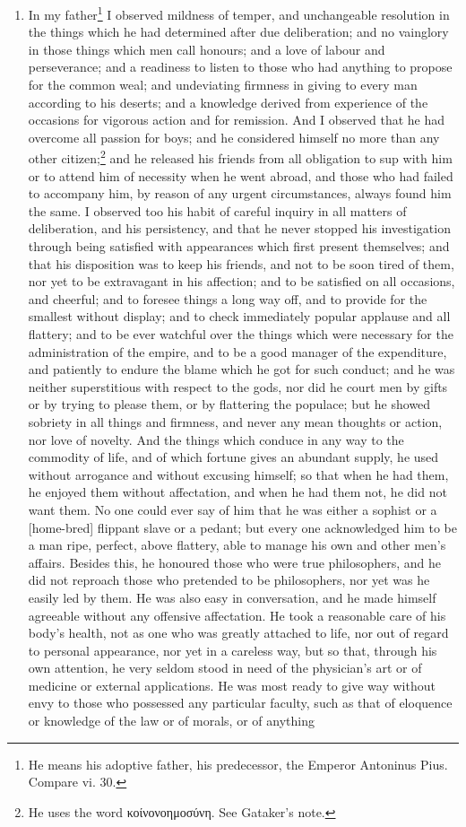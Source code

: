 \begin{enumerate}
\item In my father\footnote{He means his adoptive father, his predecessor, the Emperor Antoninus Pius. Compare vi. 30.} I observed mildness of temper, and unchangeable resolution in the things which he had determined after due deliberation; and no vainglory in those things which men call honours; and a love of labour and perseverance; and a readiness to listen to those who had anything to propose for the common weal; and undeviating firmness in giving to every man according to his deserts; and a knowledge derived from experience of the occasions for vigorous action and for remission. And I observed that he had overcome all passion for boys; and he considered himself no more than any other citizen;\footnote{He uses the word \textgreek{κοίνονοημοσύνη}. See Gataker's note.} and he released his friends from all obligation to sup with him or to attend him of necessity when he went abroad, and those who had failed to accompany him, by reason of any urgent circumstances, always found him the same. I observed too his habit of careful inquiry in all matters of deliberation, and his persistency, and that he never stopped his investigation through being satisfied with appearances which first present themselves; and that his disposition was to keep his friends, and not to be soon tired of them, nor yet to be extravagant in his affection; and to be satisfied on all occasions, and cheerful; and to foresee things a long way off, and to provide for the smallest without display; and to check immediately popular applause and all flattery; and to be ever watchful over the things which were necessary for the administration of the empire, and to be a good manager of the expenditure, and patiently to endure the blame which he got for such conduct; and he was neither superstitious with respect to the gods, nor did he court men by gifts or by trying to please them, or by flattering the populace; but he showed sobriety in all things and firmness, and never any mean thoughts or action, nor love of novelty. And the things which conduce in any way to the commodity of life, and of which fortune gives an abundant supply, he used without arrogance and without excusing himself; so that when he had them, he enjoyed them without affectation, and when he had them not, he did not want them. No one could ever say of him that he was either a sophist or a [{\clarify home-bred}] flippant slave or a pedant; but every one acknowledged him to be a man ripe, perfect, above flattery, able to manage his own and other men's affairs. Besides this, he honoured those who were true philosophers, and he did not reproach those who pretended to be philosophers, nor yet was he easily led by them. He was also easy in conversation, and he made himself agreeable without any offensive affectation. He took a reasonable care of his body's health, not as one who was greatly attached to life, nor out of regard to personal appearance, nor yet in a careless way, but so that, through his own attention, he very seldom stood in need of the physician's art or of medicine or external applications. He was most ready to give way without envy to those who possessed any particular faculty, such as that of eloquence or knowledge of the law or of morals, or of anything 
\end{enumerate}
